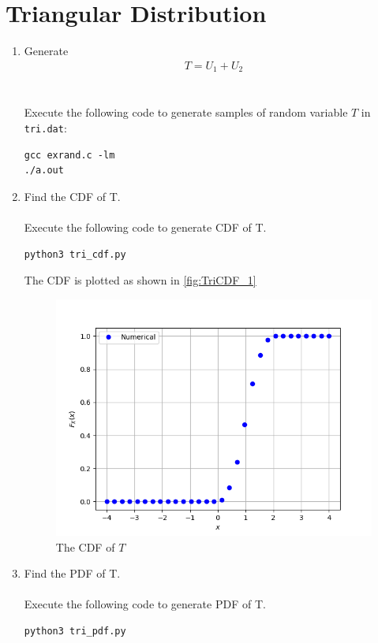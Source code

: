 \documentclass[journal,12pt,twocolumn]{IEEEtran}
\renewcommand\thesection{\arabic{section}}
\begin{document}
\section{Triangular Distribution}
\begin{enumerate}[label=\thesection.\arabic*
,ref=\thesection.\theenumi]
%

\item
	Generate 
	\begin{align}
		T = U_1 + U_2
		\label{eq:TriRV}
	\end{align}
	\\
	\solution
	\\
	Execute the following code to generate samples of random variable $T$ in \verb|tri.dat|:
	\begin{lstlisting}
gcc exrand.c -lm
./a.out
	\end{lstlisting}

\item
	Find the CDF of T.
	\\
	\solution
	\\
	Execute the following code to generate CDF of T.
	\begin{lstlisting}
python3 tri_cdf.py
	\end{lstlisting}

	The CDF is plotted as shown in \eqref{fig:TriCDF_1}
	\begin{figure}
	\centering
	\includegraphics[width=\columnwidth]{../figs/tri_cdf.png}
	\caption{The CDF of $T$}
	\label{fig:TriCDF_1}
	\end{figure}

\item
	Find the PDF of T.
	\\
	\solution
	\\
	Execute the following code to generate PDF of T.
	\begin{lstlisting}
python3 tri_pdf.py
	\end{lstlisting}


\end{enumerate}
\end{document}

